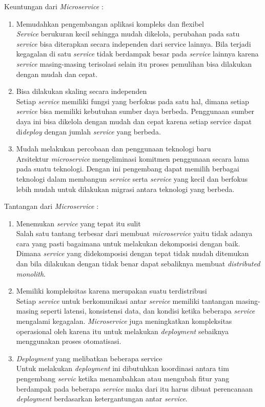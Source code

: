 Keuntungan dari \textit{Microservice}  \cite{6,7,8}:
\begin{enumerate}[leftmargin=1.3cm]
	\item Memudahkan pengembangan aplikasi kompleks dan flexibel\\
	\textit{Service} berukuran kecil sehingga mudah dikelola, perubahan pada satu \textit{service} bisa diterapkan secara independen dari service lainnya. Bila terjadi kegagalan di satu \textit{service} tidak berdampak besar pada \textit{service} lainnya karena \textit{service} masing-masing terisolasi selain itu proses pemulihan bisa dilakukan dengan mudah dan cepat.
	\item Bisa dilakukan skaling secara independen\\ 
	Setiap \textit{service} memiliki fungsi yang berfokus pada satu hal,  dimana setiap \textit{service} bisa memiliki kebutuhan sumber daya berbeda. Penggunaan sumber daya ini bisa dikelola dengan mudah dan cepat karena setiap service dapat di\textit{deploy} dengan jumlah \textit{service} yang berbeda.
	\item Mudah melakukan percobaan dan penggunaan teknologi baru\\
	Arsitektur \textit{microservice} mengeliminasi komitmen penggunaan secara lama pada suatu teknologi. Dengan ini pengembang dapat memilih berbagai teknologi dalam membangun \textit{service} serta \textit{service} yang kecil dan berfokus lebih mudah untuk dilakukan migrasi antara teknologi yang berbeda. 
\end{enumerate}	

Tantangan dari \textit{Microservice}  \cite{6,7,8}:
\begin{enumerate}[leftmargin=1.3cm]
	\item Menemukan \textit{service} yang tepat itu sulit\\
	Salah satu tantang terbesar dari membuat \textit{microservice} yaitu tidak adanya cara yang pasti bagaimana untuk melakukan dekomposisi dengan baik. Dimana \textit{service} yang didekomposisi dengan tepat tidak mudah ditemukan dan bila dilakukan dengan tidak benar dapat sebaliknya membuat \textit{distributed monolith}. 
	\item Memiliki kompleksitas karena merupakan suatu terdistribusi\\
	Setiap \textit{service} untuk berkomunikasi antar \textit{service} memiliki tantangan masing-masing seperti latensi, konsistensi data, dan kondisi ketika beberapa \textit{service} mengalami kegagalan. \textit{Microservice} juga meningkatkan kompleksitas operasional oleh karena itu untuk melakukan \textit{deployment} sebaiknya menggunakan proses otomatisasi.
	\item \textit{Deployment} yang melibatkan beberapa service\\
	Untuk melakukan \textit{deployment} ini dibutuhkan koordinasi antara tim pengembang \textit{servic} ketika menambahkan atau mengubah fitur yang berdampak pada beberapa \textit{service} maka dari itu harus dibuat perencanaan \textit{deployment} berdasarkan ketergantungan antar \textit{service}.
\end{enumerate}	

